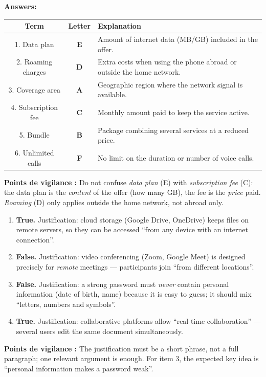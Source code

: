 \documentclass[11pt]{article}
\begin{document}
\begin{corrige}
\textbf{Answers:}
\begin{center}
\begin{tabular}{|c|c|l|}\hline
\textbf{Term} & \textbf{Letter} & \textbf{Explanation} \\\hline
1. Data plan & \textbf{E} & Amount of internet data (MB/GB) included in the offer. \\\hline
2. Roaming charges & \textbf{D} & Extra costs when using the phone abroad or outside the home network. \\\hline
3. Coverage area & \textbf{A} & Geographic region where the network signal is available. \\\hline
4. Subscription fee & \textbf{C} & Monthly amount paid to keep the service active. \\\hline
5. Bundle & \textbf{B} & Package combining several services at a reduced price. \\\hline
6. Unlimited calls & \textbf{F} & No limit on the duration or number of voice calls. \\\hline
\end{tabular}
\end{center}
\textbf{Points de vigilance :} Do not confuse \emph{data plan} (E) with \emph{subscription fee} (C): the data plan is the \emph{content} of the offer (how many GB), the fee is the \emph{price} paid. \emph{Roaming} (D) only applies outside the home network, not abroad only.
\end{corrige}

\begin{corrige}
\begin{enumerate}
\item \textbf{True.} Justification: cloud storage (Google Drive, OneDrive) keeps files on remote servers, so they can be accessed ``from any device with an internet connection''.
\item \textbf{False.} Justification: video conferencing (Zoom, Google Meet) is designed precisely for \emph{remote} meetings — participants join ``from different locations''.
\item \textbf{False.} Justification: a strong password must \emph{never} contain personal information (date of birth, name) because it is easy to guess; it should mix ``letters, numbers and symbols''.
\item \textbf{True.} Justification: collaborative platforms allow ``real-time collaboration'' — several users edit the same document simultaneously.
\end{enumerate}
\textbf{Points de vigilance :} The justification must be a short phrase, not a full paragraph; one relevant argument is enough. For item 3, the expected key idea is ``personal information makes a password weak''.
\end{corrige}
\end{document}
